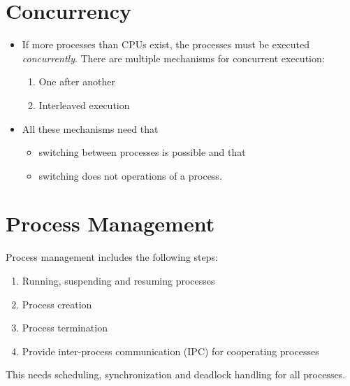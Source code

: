     \section{Concurrency}
        \begin{itemize}
        	\item If more processes than CPUs exist, the processes must be executed \textit{concurrently}. There are multiple mechanisms for concurrent execution:
            	\begin{enumerate}
            		\item One after another
            		\item Interleaved execution
            	\end{enumerate}
        	\item All these mechanisms need that
            	\begin{itemize}
            		\item switching between processes is possible and that
            		\item switching does not operations of a process.
            	\end{itemize}
        \end{itemize}

    \section{Process Management}
        Process management includes the following steps:
        \begin{enumerate}
        	\item Running, suspending and resuming processes
        	\item Process creation
        	\item Process termination
        	\item Provide inter-process communication (IPC) for cooperating processes
        \end{enumerate}
        This needs scheduling, synchronization and deadlock handling for all processes.
        
